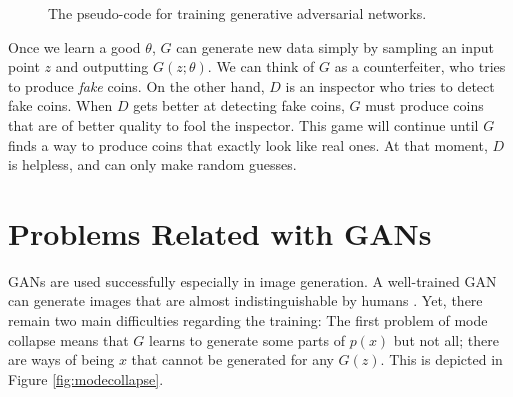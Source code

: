 \documentclass[a4paper,onesided,12pt]{report}
\begin{document}
%
\begin{figure}[htbp]
\begin{center}
\end{center}
\caption{The pseudo-code for training generative adversarial networks.}
\label{alg:gan}
\end{figure}

Once we learn a good $\theta$, $G$ can generate new data simply by sampling an input point $z$ and outputting $G(z;\theta)$. We can think of $G$ as a counterfeiter, who tries to produce \emph{fake} coins. On the other hand, $D$ is an inspector who tries to detect fake coins. When $D$ gets better at detecting fake coins, $G$ must produce coins that are of better quality to fool the inspector. This game will continue until $G$ finds a way to produce coins that exactly look like real ones. At that moment, $D$ is helpless, and can only make random guesses.

\section{Problems Related with GANs}
\label{sec:problems}

GANs are used successfully especially in image generation. A well-trained GAN can generate images that are almost indistinguishable by humans \cite{karras2017progressive,brock2018large,karras2019style}. Yet, there remain two main difficulties regarding the training: The first problem of mode collapse means that $G$ learns to generate some parts of $p(x)$ but not all; there are ways of being $x$ that cannot be generated for any $G(z)$. This is depicted in Figure \ref{fig:modecollapse}.
\end{document}
